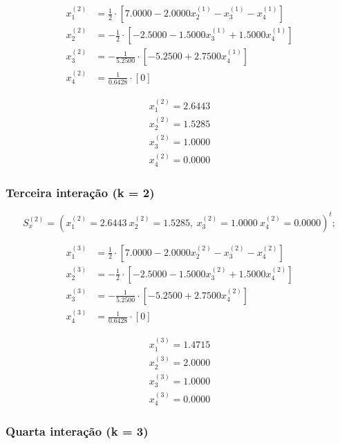 \documentclass[12pt]{article}
\begin{document}
                \begin{align*}
                    x_1^{(2)} &= \frac{1}{2} \cdot [7.0000 - 2.0000x_2^{(1)} - x_3^{(1)} - x_4^{(1)}]\\
                    x_2^{(2)} &= -\frac{1}{2} \cdot [-2.5000 - 1.5000x_3^{(1)} + 1.5000x_4^{(1)}]\\
                    x_3^{(2)} &= -\frac{1}{5.2500} \cdot [-5.2500 + 2.7500x_4^{(1)}]\\
                    x_4^{(2)} &= \frac{1}{0.6428} \cdot [0]
                \end{align*}

                \begin{align*}
                    x_1^{(2)} = 2.6443\\ x_2^{(2)}= 1.5285\\ x_3^{(2)}= 1.0000\\ x_4^{(2)}= 0.0000
                \end{align*}

            \subsubsection{Terceira interação (k = 2)}

                \[
                S_x^{(2)} = (x_1^{(2)} = 2.6443\ x_2^{(2)}= 1.5285,\ x_3^{(2)}= 1.0000\ x_4^{(2)}= 0.0000)^t;
                \]

                \begin{align*}
                    x_1^{(3)} &= \frac{1}{2} \cdot [7.0000 - 2.0000x_2^{(2)} - x_3^{(2)} - x_4^{(2)}]\\
                    x_2^{(3)} &= -\frac{1}{2} \cdot [-2.5000 - 1.5000x_3^{(2)} + 1.5000x_4^{(2)}]\\
                    x_3^{(3)} &= -\frac{1}{5.2500} \cdot [-5.2500 + 2.7500x_4^{(2)}]\\
                    x_4^{(3)} &= \frac{1}{0.6428} \cdot [0]
                \end{align*}

                \begin{align*}
                    x_1^{(3)} = 1.4715\\ x_2^{(3)}= 2.0000\\ x_3^{(3)}= 1.0000\\ x_4^{(3)}= 0.0000
                \end{align*}

            \subsubsection{Quarta interação (k = 3)}
\end{document}
